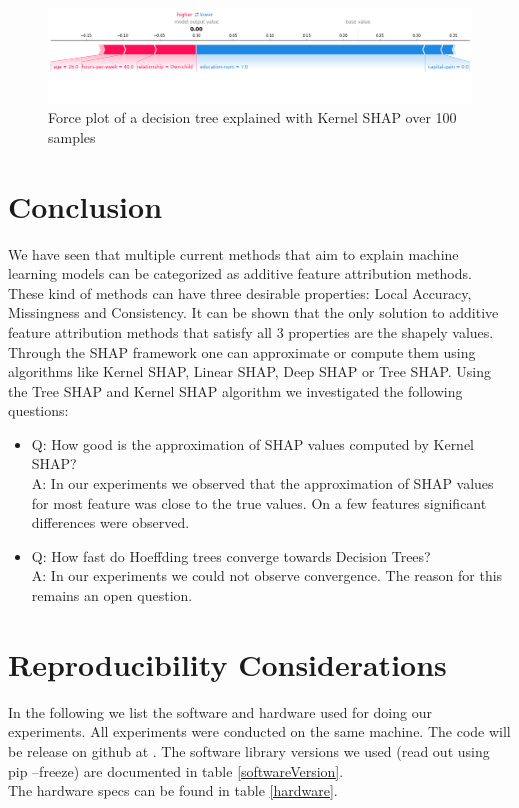 \documentclass[conference]{IEEEtran}
\begin{document}
\begin{figure}[htbp]
\centerline{
	\includegraphics[width=\linewidth]{../fig/ex_02_KernelShap_100_Samples_ForcePlot_sample_1.png}
}
\caption{Force plot of a decision tree explained with Kernel SHAP over 100 samples}
\label{fig9}
\end{figure}


\section{Conclusion}
\label{Conclusion}
We have seen that multiple current methods that aim to explain machine learning models can be categorized as additive feature attribution methods. 
These kind of methods can have three desirable properties: Local Accuracy, Missingness and Consistency.
It can be shown that the only solution to additive feature attribution methods that satisfy all 3 properties are the shapely values.
Through the SHAP framework one can approximate or compute them using algorithms like Kernel SHAP, Linear SHAP, Deep SHAP or Tree SHAP.
Using the Tree SHAP and Kernel SHAP algorithm we investigated the following questions:
\begin{itemize}
	\item Q: How good is the approximation of SHAP values computed by Kernel SHAP?\\
		  A: In our experiments we observed that the approximation of SHAP values for most feature was close to the true values. On a few features significant differences were observed.  
	\item Q: How fast do Hoeffding trees converge towards Decision Trees?\\
		  A: In our experiments we could not observe convergence. The reason for this remains an open question.
\end{itemize}

\section{Reproducibility Considerations} 
\label{Reproducibility}

In the following we list the software and hardware used for doing our experiments. 
All experiments were conducted on the same machine.
The code will be release on github at \cite{b17}.
The software library versions we used (read out using pip --freeze) are documented in table \ref{softwareVersion}.\\
 The hardware specs can be found in table \ref{hardware}.\\
\end{document}
